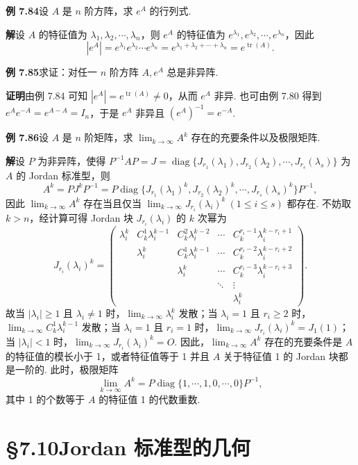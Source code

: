 \documentclass[UTF8, 12pt, fontset=fandol, oneside]{ctexart}
\begin{document}
\noindent\textbf{例 7.84}\quad 设 $A$ 是 $n$ 阶方阵，求 $e^A$ 的行列式.

\noindent\textbf{解}\quad 设 $A$ 的特征值为 $\lambda_1,\lambda_2,\cdots,\lambda_n$，则 $e^A$ 的特征值为 $e^{\lambda_1},e^{\lambda_2},\cdots,e^{\lambda_n}$，因此
\[
|e^A|=e^{\lambda_1}e^{\lambda_2}\cdots e^{\lambda_n}=e^{\lambda_1+\lambda_2+\cdots+\lambda_n}=e^{\operatorname{tr}(A)}.
\]

\noindent\textbf{例 7.85}\quad 求证：对任一 $n$ 阶方阵 $A,e^A$ 总是非异阵.

\noindent\textbf{证明}\quad 由例 7.84 可知 $|e^A|=e^{\operatorname{tr}(A)}\ne0$，从而 $e^A$ 非异. 也可由例 7.80 得到 $e^Ae^{-A}=e^{A-A}=I_n$，于是 $e^A$ 非异且 $(e^A)^{-1}=e^{-A}$.

\noindent\textbf{例 7.86}\quad 设 $A$ 是 $n$ 阶矩阵，求 $\lim_{k\to\infty}A^k$ 存在的充要条件以及极限矩阵.

\noindent\textbf{解}\quad 设 $P$ 为非异阵，使得 $P^{-1}AP=J=\operatorname{diag}\{J_{r_1}(\lambda_1),J_{r_2}(\lambda_2),\cdots,J_{r_s}(\lambda_s)\}$ 为 $A$ 的 Jordan 标准型，则
\[
A^k=PJ^kP^{-1}=P\operatorname{diag}\{J_{r_1}(\lambda_1)^k,J_{r_2}(\lambda_2)^k,\cdots,J_{r_s}(\lambda_s)^k\}P^{-1},
\]
因此 $\lim_{k\to\infty}A^k$ 存在当且仅当 $\lim_{k\to\infty}J_{r_i}(\lambda_i)^k\ (1\le i\le s)$ 都存在. 不妨取 $k>n$，经计算可得 Jordan 块 $J_{r_i}(\lambda_i)$ 的 $k$ 次幂为
\[
J_{r_i}(\lambda_i)^k=\left(\begin{array}{ccccc}
\lambda_i^k&C_k^1\lambda_i^{k-1}&C_k^2\lambda_i^{k-2}&\cdots&C_k^{r_i-1}\lambda_i^{k-r_i+1}\\
&\lambda_i^k&C_k^1\lambda_i^{k-1}&\cdots&C_k^{r_i-2}\lambda_i^{k-r_i+2}\\
&&\lambda_i^k&\cdots&C_k^{r_i-3}\lambda_i^{k-r_i+3}\\
&&&\ddots&\vdots\\
&&&&\lambda_i^k
\end{array}\right).
\]
故当 $|\lambda_i|\ge1$ 且 $\lambda_i\ne1$ 时，$\lim_{k\to\infty}\lambda_i^k$ 发散；当 $\lambda_i=1$ 且 $r_i\ge2$ 时，$\lim_{k\to\infty}C_k^1\lambda_i^{k-1}$ 发散；当 $\lambda_i=1$ 且 $r_i=1$ 时，$\lim_{k\to\infty}J_{r_i}(\lambda_i)^k=J_1(1)$；当 $|\lambda_i|<1$ 时，$\lim_{k\to\infty}J_{r_i}(\lambda_i)^k=O$. 因此，$\lim_{k\to\infty}A^k$ 存在的充要条件是 $A$ 的特征值的模长小于 1，或者特征值等于 1 并且 $A$ 关于特征值 1 的 Jordan 块都是一阶的. 此时，极限矩阵
\[
\lim_{k\to\infty}A^k=P\operatorname{diag}\{1,\cdots,1,0,\cdots,0\}P^{-1},
\]
其中 1 的个数等于 $A$ 的特征值 1 的代数重数.

\section*{§7.10\quad Jordan 标准型的几何}
\end{document}
